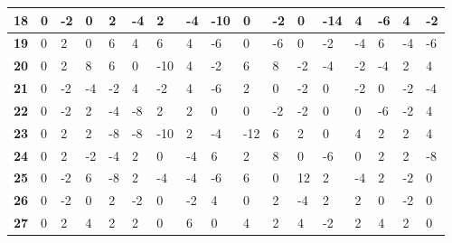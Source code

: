 \begin{longtable}[c]{|l|l|l|l|l|l|l|l|l|l|l|l|l|l|l|l|l|}
\textbf{18} & 0          & -2         & 0          & 2          & -4         & 2          & -4         & -10        & 0          & -2         & 0           & -14         & 4           & -6          & 4           & -2          \\ \hline
\textbf{19} & 0          & 2          & 0          & 6          & 4          & 6          & 4          & -6         & 0          & -6         & 0           & -2          & -4          & 6           & -4          & -6          \\ \hline
\textbf{20} & 0          & 2          & 8          & 6          & 0          & -10        & 4          & -2         & 6          & 8          & -2          & -4          & -2          & -4          & 2           & 4           \\ \hline
\textbf{21} & 0          & -2         & -4         & -2         & 4          & -2         & 4          & -6         & 2          & 0          & -2          & 0           & -2          & 0           & -2          & -4          \\ \hline
\textbf{22} & 0          & -2         & 2          & -4         & -8         & 2          & 2          & 0          & 0          & -2         & -2          & 0           & 0           & -6          & -2          & 4           \\ \hline
\textbf{23} & 0          & 2          & 2          & -8         & -8         & -10        & 2          & -4         & -12        & 6          & 2           & 0           & 4           & 2           & 2           & 4           \\ \hline
\textbf{24} & 0          & 2          & -2         & -4         & 2          & 0          & -4         & 6          & 2          & 8          & 0           & -6          & 0           & 2           & 2           & -8          \\ \hline
\textbf{25} & 0          & -2         & 6          & -8         & 2          & -4         & -4         & -6         & 6          & 0          & 12          & 2           & -4          & 2           & -2          & 0           \\ \hline
\textbf{26} & 0          & -2         & 0          & 2          & -2         & 0          & -2         & 4          & 0          & 2          & -4          & 2           & 2           & 0           & -2          & 0           \\ \hline
\textbf{27} & 0          & 2          & 4          & 2          & 2          & 0          & 6          & 0          & 4          & 2          & 4           & -2          & 2           & 4           & 2           & 0           \\ \hline

\end{longtable}
